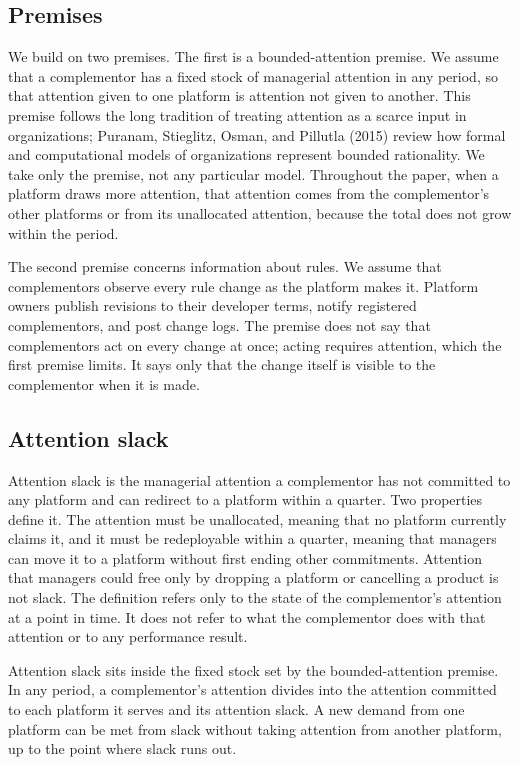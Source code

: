 \documentclass[12pt]{article}
\begin{document}
\subsection{Premises}

We build on two premises. The first is a bounded-attention premise. We assume that a complementor has a fixed stock of managerial attention in any period, so that attention given to one platform is attention not given to another. This premise follows the long tradition of treating attention as a scarce input in organizations; Puranam, Stieglitz, Osman, and Pillutla (2015) review how formal and computational models of organizations represent bounded rationality. We take only the premise, not any particular model. Throughout the paper, when a platform draws more attention, that attention comes from the complementor's other platforms or from its unallocated attention, because the total does not grow within the period.

The second premise concerns information about rules. We assume that complementors observe every rule change as the platform makes it. Platform owners publish revisions to their developer terms, notify registered complementors, and post change logs. The premise does not say that complementors act on every change at once; acting requires attention, which the first premise limits. It says only that the change itself is visible to the complementor when it is made.

\subsection{Attention slack}

Attention slack is the managerial attention a complementor has not committed to any platform and can redirect to a platform within a quarter. Two properties define it. The attention must be unallocated, meaning that no platform currently claims it, and it must be redeployable within a quarter, meaning that managers can move it to a platform without first ending other commitments. Attention that managers could free only by dropping a platform or cancelling a product is not slack. The definition refers only to the state of the complementor's attention at a point in time. It does not refer to what the complementor does with that attention or to any performance result.

Attention slack sits inside the fixed stock set by the bounded-attention premise. In any period, a complementor's attention divides into the attention committed to each platform it serves and its attention slack. A new demand from one platform can be met from slack without taking attention from another platform, up to the point where slack runs out.
\end{document}
